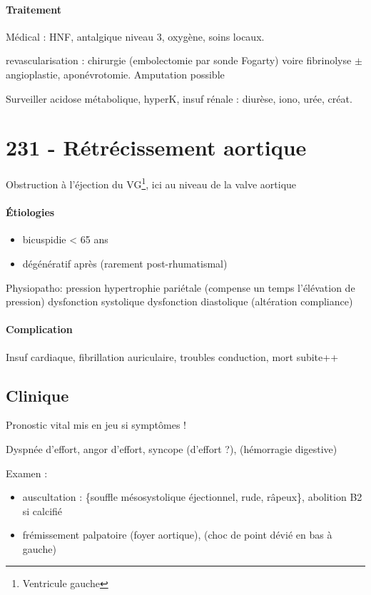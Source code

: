 \paragraph{Traitement}
Médical : HNF, antalgique niveau 3, oxygène, soins locaux.

revascularisation : chirurgie (embolectomie par sonde Fogarty) voire fibrinolyse
$\pm$ angioplastie, aponévrotomie. Amputation possible

Surveiller acidose métabolique, hyperK, insuf rénale : diurèse, iono, urée,
créat.

\section{231 - Rétrécissement aortique}%
\label{sec:231_retrecissement_aortique}
Obstruction à l'éjection du VG\footnote{Ventricule gauche}, ici au niveau de la
valve aortique

\paragraph{Étiologies} 
\begin{itemize}
  \item bicuspidie < 65 ans
  \item dégénératif après (rarement post-rhumatismal)
\end{itemize}

Physiopatho: \inc pression \thus hypertrophie pariétale (compense un temps
l'élévation de pression) \thus dysfonction systolique \thus dysfonction
diastolique (altération compliance)

\paragraph{Complication}
Insuf cardiaque, fibrillation auriculaire, troubles conduction, mort subite++

\subsection{Clinique}

Pronostic vital mis en jeu si symptômes ! \skull

Dyspnée d'effort, angor d'effort, syncope (d'effort ?), (hémorragie digestive)

Examen : 
\begin{itemize}
  \item auscultation : \{souffle mésosystolique éjectionnel, rude, râpeux\},
    abolition B2 si calcifié
  \item frémissement palpatoire (foyer aortique), (choc de point dévié en bas à
    gauche) 
\end{itemize}

